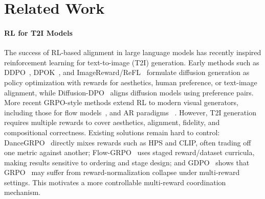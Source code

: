 \section{Related Work}
\paragraph{RL for T2I Models}
The success of RL-based alignment in large language models has recently inspired reinforcement learning for text-to-image (T2I) generation. Early methods such as DDPO~\cite{black2024training}, DPOK~\cite{fan2023dpok}, and ImageReward/ReFL~\cite{xu2023imagereward} formulate diffusion generation as policy optimization with rewards for aesthetics, human preference, or text-image alignment, while Diffusion-DPO~\cite{wallace2023diffusiondpo} aligns diffusion models using preference pairs. More recent GRPO-style methods extend RL to modern visual generators, including those for flow models~\cite{liu2025flowgrpo,xue2025dancegrpo}, and AR paradigms~\cite{yuan2025argrpo,zhang2025gcpo,ma2025stage,zhang2025maskfocus,ma2026margrpo} . However, T2I generation requires multiple rewards to cover aesthetics, alignment, fidelity, and compositional correctness. Existing solutions remain hard to control: DanceGRPO~\cite{xue2025dancegrpo} directly mixes rewards such as HPS and CLIP, often trading off one metric against another; Flow-GRPO~\cite{liu2025flowgrpo} uses staged reward/dataset curricula, making results sensitive to ordering and stage design; and GDPO~\cite{liu2026gdpo} shows that GRPO~\cite{guo2025deepseek} may suffer from reward-normalization collapse under multi-reward settings. This motivates a more controllable multi-reward coordination mechanism.

